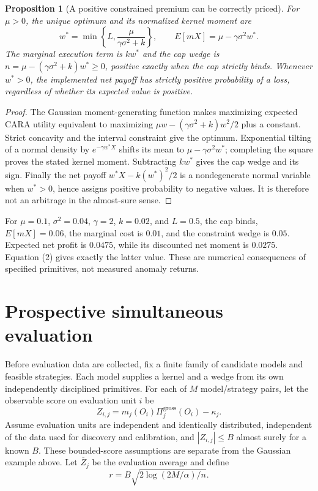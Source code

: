 \documentclass[11pt]{article}
\newtheorem{proposition}[theorem]{Proposition}
\theoremstyle{definition}
\begin{document}
\begin{proposition}[A positive constrained premium can be correctly priced]
For $\mu>0$, the unique optimum and its normalized kernel moment are
\[
 w^*=\min\left\{L,\frac{\mu}{\gamma\sigma^2+k}\right\},\qquad
 E[mX]=\mu-\gamma\sigma^2w^*.
\]
The marginal execution term is $kw^*$ and the cap wedge is
$n=\mu-(\gamma\sigma^2+k)w^*\ge0$, positive exactly when the cap strictly binds. Whenever $w^*>0$, the implemented net payoff has strictly positive probability of a loss, regardless of whether its expected value is positive.
\end{proposition}
\begin{proof}
The Gaussian moment-generating function makes maximizing expected CARA utility equivalent to maximizing
$\mu w-(\gamma\sigma^2+k)w^2/2$ plus a constant. Strict concavity and the interval constraint give the optimum. Exponential tilting of a normal density by $e^{-\gamma w^*X}$ shifts its mean to $\mu-\gamma\sigma^2w^*$; completing the square proves the stated kernel moment. Subtracting $kw^*$ gives the cap wedge and its sign. Finally the net payoff $w^*X-k(w^*)^2/2$ is a nondegenerate normal variable when $w^*>0$, hence assigns positive probability to negative values. It is therefore not an arbitrage in the almost-sure sense.
\end{proof}
For $\mu=0.1$, $\sigma^2=0.04$, $\gamma=2$, $k=0.02$, and $L=0.5$, the cap binds, $E[mX]=0.06$, the marginal cost is $0.01$, and the constraint wedge is $0.05$. Expected net profit is $0.0475$, while its discounted net moment is $0.0275$. Equation (2) gives exactly the latter value. These are numerical consequences of specified primitives, not measured anomaly returns.

\section*{Prospective simultaneous evaluation}
Before evaluation data are collected, fix a finite family of candidate models and feasible strategies. Each model supplies a kernel and a wedge from its own independently disciplined primitives. For each of $M$ model/strategy pairs, let the observable score on evaluation unit $i$ be
\[
 Z_{i,j}=m_j(O_i)\Pi_j^{\mathrm{gross}}(O_i)-\kappa_j.
\]
Assume evaluation units are independent and identically distributed, independent of the data used for discovery and calibration, and $|Z_{i,j}|\le B$ almost surely for a known $B$. These bounded-score assumptions are separate from the Gaussian example above. Let $\overline Z_j$ be the evaluation average and define
\[
 r=B\sqrt{2\log(2M/\alpha)/n}.
\]
\end{document}
